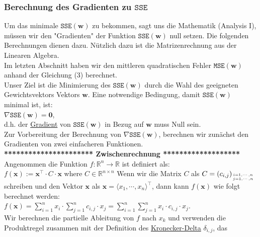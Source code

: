 \documentclass[12pt]{article}
\begin{document}
\subsubsection{Berechnung des Gradienten zu $\mathtt{SSE}$}
%
Um das minimale  $\mathtt{SSE}(\mathbf{w})$ zu bekommen, sagt uns die Mathematik (Analysis I), müssen wir den "Gradienten" der Funktion $\mathtt{SSE}(\mathbf{w})$ null setzen. Die folgenden Berechnungen dienen dazu. Nützlich dazu ist die Matrizenrechnung aus der Linearen Algebra.\\[0.2cm]
%
Im letzten Abschnitt haben wir den mittleren quadratischen Fehler $\mathtt{MSE}(\mathbf{w})$ anhand der Gleichung (3) berechnet.\\
Unser Ziel ist die Minimierung des $\mathtt{SSE}(\mathbf{w})$ durch die Wahl des geeigneten Gewichtsvektors Vektors $\mathbf{w}$.  Eine notwendige Bedingung, damit $\mathtt{SSE}(\mathbf{w})$ minimal ist, ist: 
\\[0.2cm]
\hspace*{1.3cm}
$\nabla \mathtt{SSE}(\mathbf{w}) = \mathbf{0}$,
\\[0.2cm]
d.h. der \href{https://en.wikipedia.org/wiki/Gradient}{Gradient}  von $\mathtt{SSE}(\mathbf{w})$ in Bezug auf $\mathbf{w}$ muss Null sein. \\
Zur Vorbereitung der Berechnung von $\nabla \mathtt{SSE}(\mathbf{w})$, berechnen wir zunächst den Gradienten von zwei einfacheren Funktionen.\\[0.4cm]
\textbf{********************** Zwischenrechnung *******************}\\[0.4cm]
%
Angenommen die Funktion $f:\mathbb{R}^n \rightarrow \mathbb{R}$ ist definiert als:
\\[0.2cm]
\hspace*{1.3cm}
$f(\mathbf{x}) := \mathbf{x}^\top \cdot C \cdot \mathbf{x}$ \quad where $C \in \mathbb{R}^{n \times n}$
%
Wenn wir die Matrix $C$ als $C = (c_{i,j})_{i=1,\cdots,n \atop j=1,\cdots,n}$ schreiben und den Vektor
$\mathbf{x}$ als $\mathbf{x} = \langle x_1, \cdots, x_n \rangle^\top$, dann kann $f(\mathbf{x})$ wie folgt berechnet werden:
\\[0.2cm]
\hspace*{1.3cm}
$ f(\mathbf{x}) = \sum\limits_{i=1}^n x_i \cdot \sum\limits_{j=1}^n c_{i,j} \cdot x_j = \sum\limits_{i=1}^n \sum\limits_{j=1}^n x_i \cdot c_{i,j} \cdot x_j $.
\\[0.2cm]
Wir berechnen die partielle Ableitung von $f$ nach $x_k$ und verwenden die Produktregel zusammen mit der
Definition des \href{https://en.wikipedia.org/wiki/Kronecker_delta}{Kronecker-Delta} $\delta_{i,j}$, das
\end{document}
